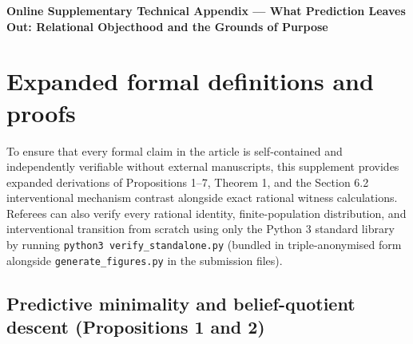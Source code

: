 \documentclass[12pt,letterpaper]{article}
\begin{document}
\thispagestyle{plain}
\begin{center}
{\fontsize{17}{22}\selectfont\bfseries Online Supplementary Technical
Appendix --- What Prediction Leaves Out: Relational Objecthood and the
Grounds of Purpose\par}
\end{center}
\vspace{8pt}
\begin{abstract}
\noindent Expanded self-contained mathematical definitions, derivations,
and rational witness calculations supporting Propositions 1--7, Theorem
1, and Section 6.2 (Appendix A), reproducible via the bundled
triple-anonymised Python 3 standard-library script
\texttt{verify\_standalone.py}, together with the complete anonymised
generative AI documentation log required by the BSPS/BJPS AI Policy
(Appendix B).
\end{abstract}
\vspace{10pt}

\appendix

\section{Expanded formal definitions and
proofs}\label{expanded-formal-definitions-and-proofs}

To ensure that every formal claim in the article is self-contained and
independently verifiable without external manuscripts, this supplement
provides expanded derivations of Propositions 1--7, Theorem 1, and the
Section 6.2 interventional mechanism contrast alongside exact rational
witness calculations. Referees can also verify every rational identity,
finite-population distribution, and interventional transition from
scratch using only the Python 3 standard library by running
\texttt{python3\ verify\_standalone.py} (bundled in triple-anonymised
form alongside \texttt{generate\_figures.py} in the submission files).

\subsection{Predictive minimality and belief-quotient descent
(Propositions 1 and
2)}\label{predictive-minimality-and-belief-quotient-descent-propositions-1-and-2}
\end{document}
